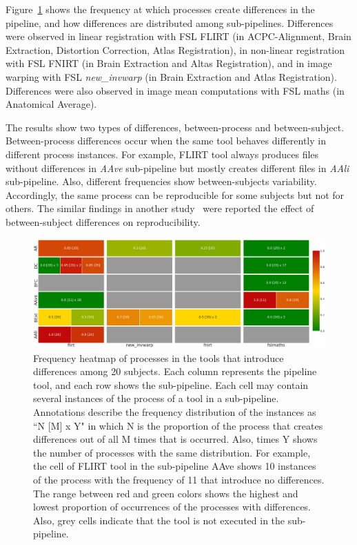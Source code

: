 \documentclass[a4paper,num-refs]{oup-contemporary}
\begin{document}
Figure~\ref{fig:pfs_freq} shows the frequency at which  processes create differences 
in the pipeline, and how differences are distributed among sub-pipelines.
Differences were observed in linear registration 
with FSL FLIRT (in ACPC-Alignment, Brain Extraction, Distortion Correction, 
Atlas Registration), in non-linear registration with FSL FNIRT (in Brain Extraction 
and Altas Registration), and in image warping with FSL \emph{new\_invwarp} (in Brain Extraction 
and Atlas Registration). Differences were also observed in image mean 
computations with FSL maths  (in Anatomical Average). 

The results show two types of differences, between-process and between-subject.
Between-process differences occur when the same tool behaves differently in different process instances.
For example, 
FLIRT tool always produces files without differences in \emph{AAve} sub-pipeline but 
mostly creates different files in \emph{AAli} sub-pipeline.
Also, different frequencies show between-subjects variability.
Accordingly, the same process can be reproducible for some subjects but not for others. 
The similar findings in another study~\cite{bowring2019exploring} were reported 
the effect of between-subject differences on reproducibility.


\begin{figure}
\centering
  \includegraphics[width=\textwidth]{images/pfs_heatmap.png}
  \caption{Frequency heatmap of processes in the tools that introduce differences among 20 subjects. 
           Each column represents the pipeline tool, and each row shows the sub-pipeline.
           Each cell may contain several instances of the process of a tool in a sub-pipeline.
           Annotations describe the frequency distribution of the instances as ``N [M] x Y" 
           in which N is the proportion of the process 
           that creates differences out of all M times that is occurred. 
           Also, times Y shows the number of processes with the same distribution.
           For example, the cell of FLIRT tool in the sub-pipeline AAve shows 10 instances of the process 
           with the frequency of 11 that introduce no differences.
           The range between red and green colors shows the highest and lowest 
           proportion of occurrences of the processes with differences.
           Also, grey cells indicate that the tool is not executed in the sub-pipeline.}
  \label{fig:pfs_freq}
\end{figure}
\end{document}
